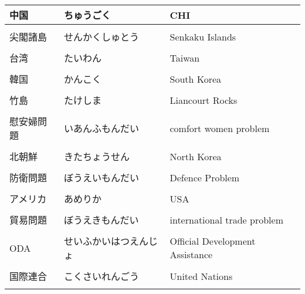 \documentclass{article}
\begin{document}
\begin{tabular}{  l | l | p{7.5cm} }
 中国					& ちゅうごく				& CHI \\ \hline \\[-1em]
 尖閣諸島					& せんかくしゅとう			& Senkaku Islands　\\ \hline \\[-1em]
 台湾					& たいわん				& Taiwan \\ \hline \\[-1em]
 韓国					& かんこく 				& South Korea\\ \hline \\[-1em]
 竹島					& たけしま				& Liancourt Rocks \\ \hline \\[-1em]
 慰安婦問題				& いあんふもんだい		& comfort women problem\\ \hline \\[-1em]
 北朝鮮					& きたちょうせん			& North Korea \\ \hline \\[-1em]
 防衛問題					& ぼうえいもんだい		& Defence Problem \\ \hline \\[-1em]
 アメリカ					& あめりか				& USA	 \\ \hline \\[-1em]
 貿易問題					& ぼうえきもんだい		& international trade problem\\ \hline \\[-1em]
 ODA				& せいふかいはつえんじょ  &Official Development Assistance \\ \hline \\[-1em]
 国際連合					& こくさいれんごう 		& United Nations \\ \hline \\[-1em]
    \end{tabular}
\end{document}
